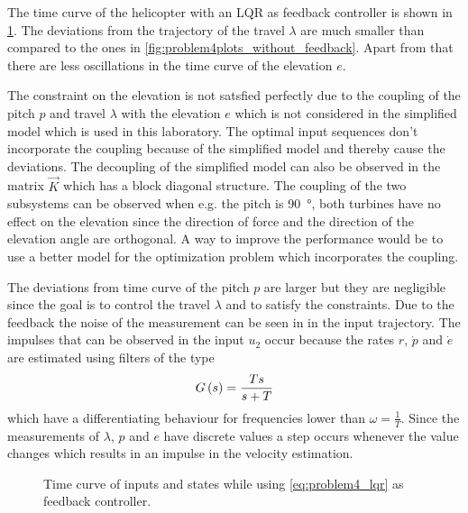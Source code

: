 The time curve of the helicopter with an LQR as feedback controller is shown in \cref{fig:problem4plot_511111_11}. The deviations from the trajectory of the travel $\lambda$ are much smaller than compared to the ones in \cref{fig:problem4plots_without_feedback}. Apart from that there are less oscillations in the time curve of the elevation $e$. 

The constraint on the elevation is not satsfied perfectly due to the coupling of the pitch $p$ and travel $\lambda$ with the elevation $e$ which is not considered in the simplified model which is used in this laboratory. The optimal input sequences don't incorporate the coupling because of the simplified model and thereby cause the deviations. The decoupling of the simplified model can also be observed in the matrix $\vec{K}$ which has a block diagonal structure. The coupling of the two subsystems can be observed when e.g. the pitch is \SI{90}{\degree}, both turbines have no effect on the elevation since the direction of force and the direction of the elevation angle are orthogonal. A way to improve the performance would be to use a better model for the optimization problem which incorporates the coupling.

The deviations from time curve of the pitch $p$ are larger but they are negligible since the goal is to control the travel $\lambda$ and to satisfy the constraints. Due to the feedback the noise of the measurement can be seen in in the input trajectory. The impulses that can be observed in the input $u_2$ occur because the rates $r$, $\dot{p}$ and $\dot{e}$ are estimated using filters of the type 
\begin{equation}
G\left(s\right)=\frac{Ts}{s+T}
\end{equation}
which have a differentiating behaviour for frequencies lower than $\omega=\frac{1}{T}$. Since the measurements of $\lambda$, $p$ and $e$ have discrete values a step occurs whenever the value changes which results in an impulse in the velocity estimation.

\begin{figure}[htbp]
	\centering
	\caption{Time curve of inputs and states while using \eqref{eq:problem4_lqr} as feedback controller.}
	\label{fig:problem4plot_511111_11}%
\end{figure}

